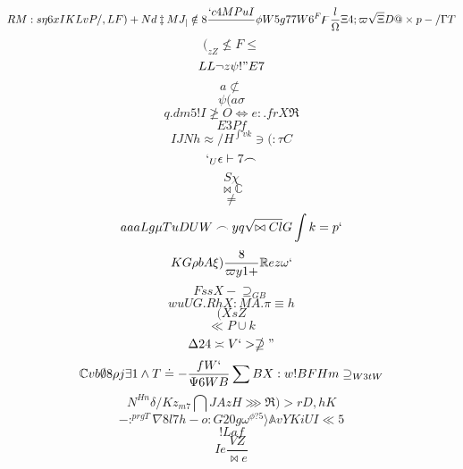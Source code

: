 \documentclass[12pt]{article}
\begin{document}
        \begin{minipage}[t][0pt]{\linewidth}

        \[RM:s\eta 6 x I K L v P / , L F ) + N d\ddagger M J_{\mid}\notin 8\frac{`c4MPuI}{}\phi W 5 g 7 7 W 6^{F}\digamma\frac{l}{\Omega}\Xi 4 ;\varpi\sqrt{\Xi} D @\times p - /\Gamma T\]
\[(_{zZ}\nleq F\leq\]
\[LL\neg z\psi ! " E 7\]
\[a\not\subset\]
\[\psi ( a\sigma\]
\[q.dm5!I\ngeq O\Leftrightarrow e : . f r X\Re\]
\[E3Pf\]
\[IJNh\approx / H^{\int v k}\ni ( :\tau C\]
\[`_{U}\epsilon\vdash 7 {\frown}\]
\[S\chi\]
\[\bowtie\mathbb{C}\]
\[\neq\]
\[aaaLg\mu T u D U W\frown y q\sqrt{\bowtie C l} G\int k = p `\]
\[K {G}\rho b A\xi )\frac{8}{\varpi y 1 +}\mathbb{R} e z\omega `\]
\[FssX-\supseteq_{GB}\]
\[wuUG.RhX:MA.\pi\equiv h\]
\[(XsZ\]
\[\ll P\cup k\]
\[\Delta 2 4\asymp V ` >\nsupseteq "\]
\[\mathbb{C} v b\emptyset 8\rho j\exists 1\land T\doteq -\frac{fW`}{\Psi 6 W B}\sum B X : w ! B F H m\supseteq_{W3tW}\]
\[N^{Hn}\delta / K z_{m7}\bigcap J A z H\ggg\Re ) > r D , h K\]
\[-:^{prgT}\nabla 8 l 7 h - o : G 2 0 g\omega^{\phi ? 5}\rangle\mathbb{A} v Y K i U I\ll 5\]
\[!Laf\]
\[Ie\frac{VZ}{\bowtie e}
        \]
\end{minipage}
\end{document}
